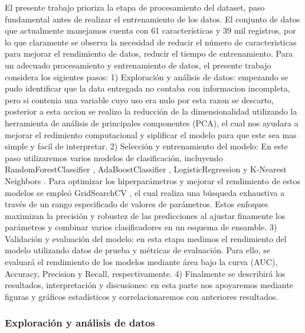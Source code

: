 \documentclass[
  number,
  preprint,
  3p,
  twocolumn]{elsarticle}
\begin{document}
El presente trabajo prioriza la etapa de procesamiento del dataset, paso
fundamental antes de realizar el entrenamiento de los datos. El conjunto
de datos que actualmente manejamos cuenta con 61 características y 39
mil registros, por lo que claramente se observa la necesidad de reducir
el número de caracteristicas para mejorar el rendimiento de datos,
reducir el tiempo de entrenamiento. Para un adecuado procesamiento y
entrenamiento de datos, el presente trabajo considera los sigientes
pasos: 1) Exploración y análisis de datos: empezando se pudo identificar
que la data entregada no contaba con informacion incompleta, pero si
contenia una variable cuyo uso era nulo por esta razon se descarto,
posterior a esta accion se realizo la reducción de la dimensionalidad
utilizando la herramienta de análisis de principales componentes (PCA),
el cual nos ayudara a mejorar el redimiento computacional y siplificar
el modelo para que este sea mas simple y facil de interpretar. 2)
Selección y entrenamiento del modelo: En este paso utilizaremos varios
modelos de clasificación, incluyendo RandomForestClassifier
\citep{breiman2001}, AdaBoostClassifier \citep{freund1997},
LogisticRegression \citep{cox1958} y K-Nearest Neighbors
\citep{Cover1967}. Para optimizar los hiperparámetros y mejorar el
rendimiento de estos modelos se empleó GridSearchCV
\citep{pedregosa2011}, el cual realiza una búsqueda exhaustiva a través
de un rango especificado de valores de parámetros. Estos enfoques
maximizan la precisión y robustez de las predicciones al ajustar
finamente los parámetros y combinar varios clasificadores en un esquema
de ensamble. 3) Validación y evaluación del modelo: en esta etapa
medimos el rendimiento del modelo utilizando datos de prueba y métricas
de evaluación. Para ello, se evaluará el rendimiento de los modelos
mediante área bajo la curva (AUC), Accuracy, Precision y Recall,
respectivamente. 4) Finalmente se describirá los resultados,
interpretación y discusiones: en esta parte nos apoyaremos mediante
figuras y gráficos estadísticos y correlacionaremos con anteriores
resultados.

\subsubsection{Exploración y análisis de
datos}\label{exploraciuxf3n-y-anuxe1lisis-de-datos}
\end{document}
